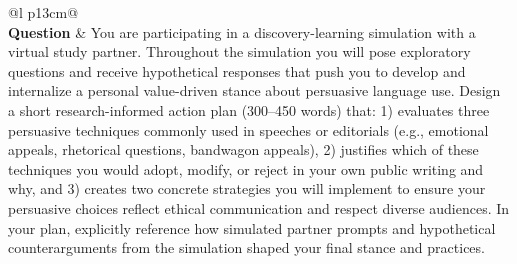 \begin{longtable}{@{}l p{13cm}@{}}
   \\
  \textbf{Question}  & You are participating in a discovery-learning simulation with a virtual study partner. Throughout the simulation you will pose exploratory questions and receive hypothetical responses that push you to develop and internalize a personal value-driven stance about persuasive language use. Design a short research-informed action plan (300--450 words) that: 1) evaluates three persuasive techniques commonly used in speeches or editorials (e.g., emotional appeals, rhetorical questions, bandwagon appeals), 2) justifies which of these techniques you would adopt, modify, or reject in your own public writing and why, and 3) creates two concrete strategies you will implement to ensure your persuasive choices reflect ethical communication and respect diverse audiences. In your plan, explicitly reference how simulated partner prompts and hypothetical counterarguments from the simulation shaped your final stance and practices.   \\

\end{longtable}

